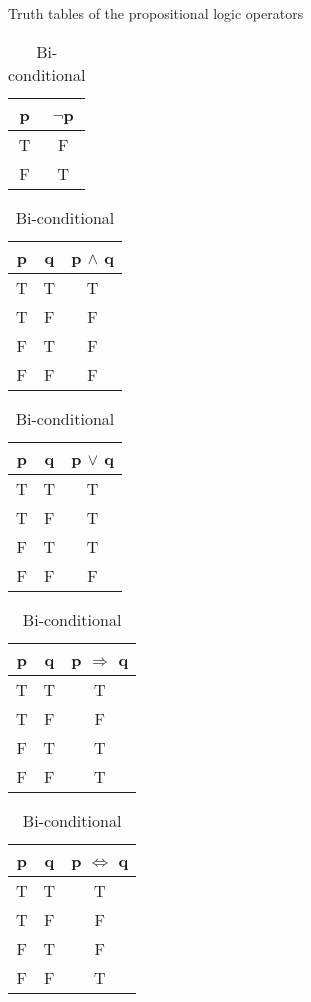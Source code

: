 \begin{defn}\label{mod1:axiom:Negation}
	Truth tables of the propositional logic operators

		\begin{table}[ht]
				\centering
		\begin{tabular}{|c |c|}
			\hline
			p &  $\lnot$p\\
			\hline
			T & F\\
			F & T\\
			\hline
		\end{tabular}
		\caption{Negation}
		\label{mod1:tab:Negation}
		\medskip


		\centering
		\begin{tabular}{|c c|c|}
			\hline
			p & q & p $\land$ q\\
			\hline
			T & T & T\\
			T & F & F\\
			F & T & F\\
			F & F & F\\
			
			\hline
		\end{tabular}
		\caption{Conjunction}
		\label{mod1:tab:Conjunction}
		\medskip
	
		\begin{tabular}{|c c|c|}
			\hline
			p & q & p $\lor$ q\\
			\hline
			T & T & T\\
			T & F & T\\
			F & T & T\\
			F & F & F\\
			
			\hline
		\end{tabular}
		\caption{Disjunction}
		\label{mod1:tab:Disjunction}
		\medskip
	
	
		\begin{tabular}{|c c|c|}
			\hline
			p & q & p $\Rightarrow$ q\\
			\hline
			T & T & T\\
			T & F & F\\
			F & T & T\\
			F & F & T\\
			
			\hline
		\end{tabular}
		\caption{Conditional}
		\label{mod1:tab:Conditional}
		\medskip
		
		\begin{tabular}{|c c|c|}
			\hline
			p & q & p $\Leftrightarrow$ q\\
			\hline
			T & T & T\\
			T & F & F\\
			F & T & F\\
			F & F & T\\
			
			\hline
		\end{tabular}
		\caption{Bi-conditional}
		\label{mod1:tab:Bi-conditional}
		\end{table}

\end{defn}

